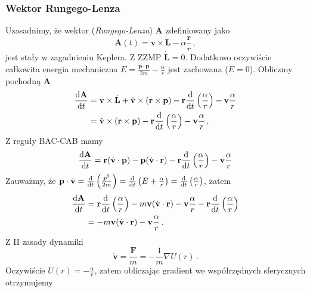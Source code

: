 \documentclass[../main.tex]{subfiles}
\begin{document}
\subsubsection{Wektor Rungego-Lenza}
Uzasadnimy, że wektor (\textit{Rungego-Lenza}) \(\mathbf{A}\) zdefiniowany jako
\begin{equation*}
    \mathbf{A}(t)=\mathbf{v}\times\mathbf{L}-\alpha\frac{\mathbf{r}}{r}\,,
\end{equation*}
 jest stały w zagadnieniu Keplera. Z ZZMP \(\dot{\mathbf{L}}=0\). Dodatkowo oczywiście całkowita energia mechaniczna \(E=\frac{\mathbf{p}\cdot\mathbf{p}}{2m}-\frac{\alpha}{r}\) jest zachowana (\(\dot E=0\)). Obliczmy pochodną \(\dot{\mathbf{A}}\)
\begin{equation*}
\begin{split}
    \dv{\mathbf{A}}{t}&=\mathbf{v}\times\dot{\mathbf{L}}+\dot{\mathbf{v}}\times (\mathbf{r}\times \mathbf{p})-\mathbf{r}\dv{}{t}\left(\frac{\alpha}{r}\right)-\mathbf{v}\frac{\alpha}{r}\\
    &=\dot{\mathbf{v}}\times (\mathbf{r}\times \mathbf{p})-\mathbf{r}\dv{}{t}\left(\frac{\alpha}{r}\right)-\mathbf{v}\frac{\alpha}{r}\,.
\end{split}
\end{equation*}
Z reguły BAC-CAB mamy
\begin{equation*}
    \dv{\mathbf{A}}{t}=\mathbf{r}(\dot{\mathbf{v}}\cdot \mathbf{p})-\mathbf{p}(\dot{\mathbf{v}}\cdot \mathbf{r})-\mathbf{r}\dv{}{t}\left(\frac{\alpha}{r}\right)-\mathbf{v}\frac{\alpha}{r}
\end{equation*}
Zauważmy, że \(\mathbf{p}\cdot\dot{\mathbf{v}}=\dv{}{t}\left(\frac{p^2}{2m}\right)=\dv{}{t}\left(E+\frac{\alpha}{r}\right)=\dv{}{t}\left(\frac{\alpha}{r}\right)\), zatem
\begin{equation*}
\begin{split}
    \dv{\mathbf{A}}{t}&=\mathbf{r}\dv{}{t}\left(\frac{\alpha}{r}\right)-m\mathbf{v}(\dot{\mathbf{v}}\cdot \mathbf{r})-\mathbf{v}\frac{\alpha}{r}-\mathbf{r}\dv{}{t}\left(\frac{\alpha}{r}\right)\\
    &=-m\mathbf{v}(\dot{\mathbf{v}}\cdot \mathbf{r})-\mathbf{v}\frac{\alpha}{r}\,.
\end{split}
\end{equation*}
Z II zasady dynamiki
\begin{equation*}
    \dot{\mathbf{v}}=\frac{\mathbf{F}}{m}=-\frac{1}{m}\nabla U(r)\,.
\end{equation*}
Oczywiście \(U(r)=-\frac{\alpha}{r}\), zatem obliczając gradient we współrzędnych sferycznych otrzymujemy
\end{document}
